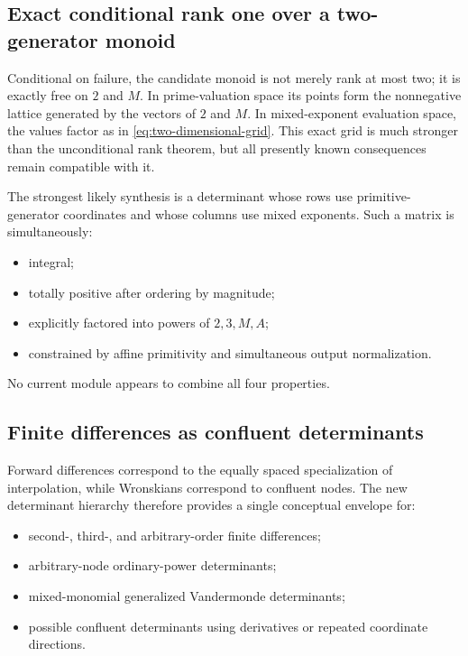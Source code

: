 \documentclass[11pt,oneside]{article}
\theoremstyle{definition}
\theoremstyle{remark}
\begin{document}
\subsection{Exact conditional rank one over a two-generator monoid}

Conditional on failure, the candidate monoid is not merely rank at most two; it is exactly
free on $2$ and $M$.  In prime-valuation space its points form the nonnegative lattice generated
by the vectors of $2$ and $M$.  In mixed-exponent evaluation space, the values factor as in
\eqref{eq:two-dimensional-grid}.  This exact grid is much stronger than the unconditional
rank theorem, but all presently known consequences remain compatible with it.

The strongest likely synthesis is a determinant whose rows use primitive-generator
coordinates and whose columns use mixed exponents.  Such a matrix is simultaneously:

\begin{itemize}
\item integral;
\item totally positive after ordering by magnitude;
\item explicitly factored into powers of $2,3,M,A$;
\item constrained by affine primitivity and simultaneous output normalization.
\end{itemize}

No current module appears to combine all four properties.

\subsection{Finite differences as confluent determinants}

Forward differences correspond to the equally spaced specialization of interpolation, while
Wronskians correspond to confluent nodes.  The new determinant hierarchy therefore provides a
single conceptual envelope for:

\begin{itemize}
\item second-, third-, and arbitrary-order finite differences;
\item arbitrary-node ordinary-power determinants;
\item mixed-monomial generalized Vandermonde determinants;
\item possible confluent determinants using derivatives or repeated coordinate directions.
\end{itemize}
\end{document}
